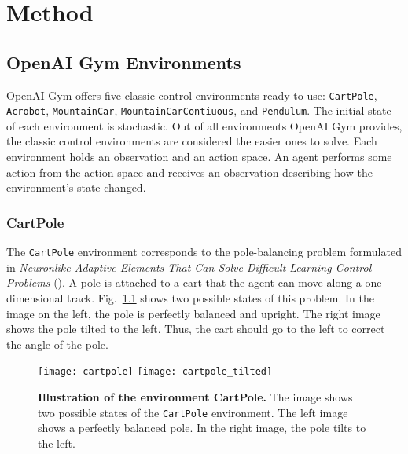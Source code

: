 
\chapter{Method}
\label{ch:method}

\section{OpenAI Gym Environments}
\label{sec:environments}
OpenAI Gym offers five classic control environments ready to use: \verb|CartPole|, \texttt{Acrobot}, \verb|MountainCar|, \verb|MountainCarContiuous|, and \verb|Pendulum|. The initial state of each environment is stochastic. Out of all environments OpenAI Gym provides, the classic control environments are considered the easier ones to solve. Each environment holds an observation and an action space. An agent performs some action from the action space and receives an observation describing how the environment's state changed.

\subsection{CartPole}
The \verb|CartPole| environment corresponds to the pole-balancing problem formulated in \emph{Neuronlike Adaptive Elements That Can Solve Difficult Learning Control Problems} (\cite{6313077}). A pole is attached to a cart that the agent can move along a one-dimensional track. Fig.~\ref{fig:cartpole} shows two possible states of this problem. In the image on the left, the pole is perfectly balanced and upright. The right image shows the pole tilted to the left. Thus, the cart should go to the left to correct the angle of the pole.
\begin{figure}[!ht]
  \centering
\texttt{[image: cartpole]} \hspace*{10mm} \texttt{[image: cartpole\_tilted]}
\caption[Illustration of the environment CartPole]{
  \textbf{Illustration of the environment CartPole.}
  The image shows two possible states of the \texttt{CartPole} environment. The left image shows a perfectly balanced pole. In the right image, the pole tilts to the left.
}
\label{fig:cartpole}
\end{figure}

